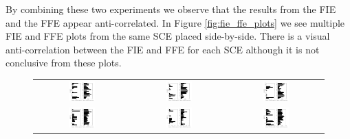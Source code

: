 By combining these two experiments we observe that the results from the FIE and the FFE appear anti-correlated. 
In Figure \ref{fig:fie_ffe_plots} we see multiple FIE and FFE plots from the same SCE placed side-by-side.
There is a visual anti-correlation between the FIE and FFE for each SCE although it is not conclusive from these plots.
\begin{figure}[!htb]
 \begin{tabular}{ccc}
     \includegraphics[width=0.3\textwidth]{fig/ccf/ccf1} & \includegraphics[width=0.3\textwidth]{fig/ccf/ccf2} & \includegraphics[width=0.3\textwidth]{fig/ccf/ccf3} \\
     \includegraphics[width=0.3\textwidth]{fig/ccf/ccf4} & \includegraphics[width=0.3\textwidth]{fig/ccf/ccf5} & \includegraphics[width=0.3\textwidth]{fig/ccf/ccf6} \\

\end{tabular}
\end{figure}
